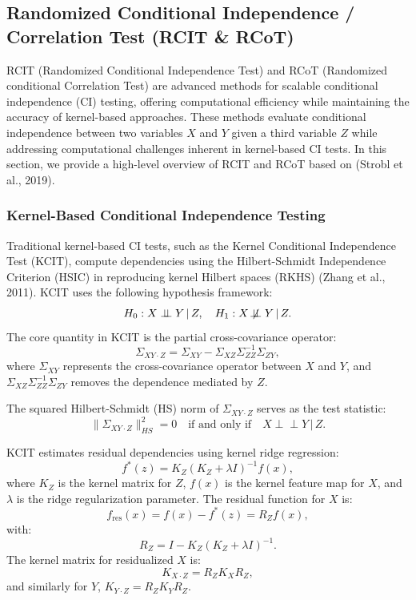 \documentclass[
]{article}
\begin{document}
\clearpage

\subsection{Randomized Conditional Independence / Correlation Test (RCIT
\& RCoT)}\label{sec-rcot}

RCIT (Randomized Conditional Independence Test) and RCoT (Randomized
conditional Correlation Test) are advanced methods for scalable
conditional independence (CI) testing, offering computational efficiency
while maintaining the accuracy of kernel-based approaches. These methods
evaluate conditional independence between two variables \(X\) and \(Y\)
given a third variable \(Z\) while addressing computational challenges
inherent in kernel-based CI tests. In this section, we provide a
high-level overview of RCIT and RCoT based on (Strobl et al., 2019).

\subsubsection{Kernel-Based Conditional Independence
Testing}\label{kernel-based-conditional-independence-testing}

Traditional kernel-based CI tests, such as the Kernel Conditional
Independence Test (KCIT), compute dependencies using the Hilbert-Schmidt
Independence Criterion (HSIC) in reproducing kernel Hilbert spaces
(RKHS) (Zhang et al., 2011). KCIT uses the following hypothesis
framework: \[
H_0: X \perp\!\!\!\perp Y \,|\, Z, \quad H_1: X \not\!\perp\!\!\!\perp Y \,|\, Z.
\] The core quantity in KCIT is the partial cross-covariance operator:
\[
\Sigma_{XY \cdot Z} = \Sigma_{XY} - \Sigma_{XZ} \Sigma_{ZZ}^{-1} \Sigma_{ZY},
\] where \(\Sigma_{XY}\) represents the cross-covariance operator
between \(X\) and \(Y\), and
\(\Sigma_{XZ} \Sigma_{ZZ}^{-1} \Sigma_{ZY}\) removes the dependence
mediated by \(Z\).

The squared Hilbert-Schmidt (HS) norm of \(\Sigma_{XY \cdot Z}\) serves
as the test statistic: \[
\|\Sigma_{XY \cdot Z}\|^2_{HS} = 0 \quad \text{if and only if} \quad X \perp\!\!\!\perp Y \,|\, Z.
\]

KCIT estimates residual dependencies using kernel ridge regression: \[
f^*(z) = K_Z (K_Z + \lambda I)^{-1} f(x),
\] where \(K_Z\) is the kernel matrix for \(Z\), \(f(x)\) is the kernel
feature map for \(X\), and \(\lambda\) is the ridge regularization
parameter. The residual function for \(X\) is: \[
f_\text{res}(x) = f(x) - f^*(z) = R_Z f(x),
\] with: \[
R_Z = I - K_Z (K_Z + \lambda I)^{-1}.
\] The kernel matrix for residualized \(X\) is: \[
K_{X \cdot Z} = R_Z K_X R_Z,
\] and similarly for \(Y\), \(K_{Y \cdot Z} = R_Z K_Y R_Z\).
\end{document}
